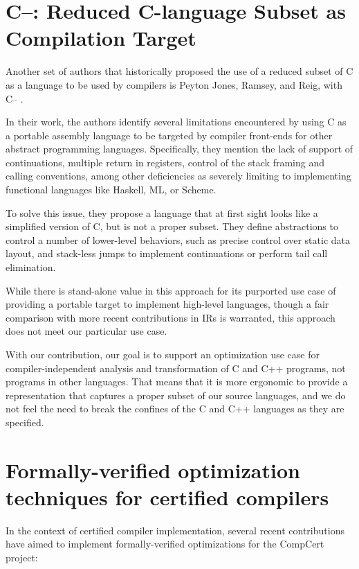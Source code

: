 \section{C--: Reduced C-language Subset as Compilation Target}

Another set of authors that historically proposed the use of a reduced subset of C as a language to be used by compilers is Peyton Jones, Ramsey, and Reig, with C-- \cite{Jones1999}.

In their work, the authors identify several limitations encountered by using C as a portable assembly language to be targeted by compiler front-ends for other abstract programming languages. Specifically, they mention the lack of support of continuations, multiple return in registers, control of the stack framing and calling conventions, among other deficiencies as severely limiting to implementing functional languages like Haskell, ML, or Scheme.

To solve this issue, they propose a language that at first sight looks like a simplified version of C, but is not a proper subset. They define abstractions to control a number of lower-level behaviors, such as precise control over static data layout, and stack-less jumps to implement continuations or perform tail call elimination.

While there is stand-alone value in this approach for its purported use case of providing a portable target to implement high-level languages, though a fair comparison with more recent contributions in IRs \cite{Lattner2004} is warranted, this approach does not meet our particular use case.

With our contribution, our goal is to support an optimization use case for compiler-independent analysis and transformation of C and C++ programs, not programs in other languages. That means that it is more ergonomic to provide a representation that captures a proper subset of our source languages, and we do not feel the need to break the confines of the C and C++ languages as they are specified.

\section{Formally-verified optimization techniques for certified compilers}

In the context of certified compiler implementation, several recent contributions have aimed to implement formally-verified optimizations for the CompCert project:

